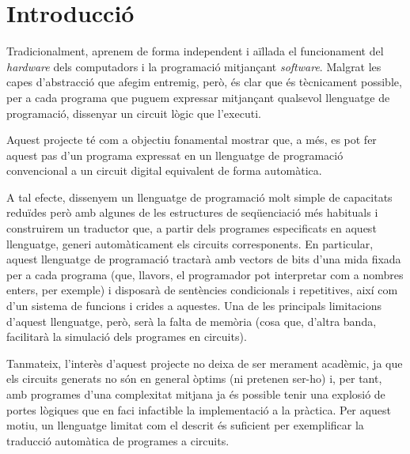 
\section{Introducció}

Tradicionalment, aprenem de forma independent i aïllada el funcionament del 
\textit{hardware} dels computadors i la programació mitjançant 
\textit{software}. Malgrat les capes d'abstracció que afegim entremig, però, 
és clar que és tècnicament possible, per a cada programa que puguem expressar 
mitjançant qualsevol llenguatge de programació, dissenyar un circuit lògic que 
l'executi.

Aquest projecte té com a objectiu fonamental mostrar que, a més, es pot fer 
aquest pas d'un programa expressat en un llenguatge de programació 
convencional a un circuit digital equivalent de forma automàtica. 

A tal efecte, dissenyem un llenguatge de programació molt simple de capacitats 
reduïdes però amb algunes de les estructures de seqüenciació més habituals i 
construirem un traductor que, a partir dels programes especificats en aquest 
llenguatge, generi automàticament els circuits corresponents. En particular, 
aquest llenguatge de programació tractarà amb vectors de bits d'una mida 
fixada per a cada programa (que, llavors, el programador pot interpretar com a 
nombres enters, per exemple) i disposarà de sentències condicionals i 
repetitives, així com d'un sistema de funcions i crides a aquestes. Una de 
les principals limitacions d'aquest llenguatge, però, serà la falta de memòria 
(cosa que, d'altra banda, facilitarà la simulació dels programes en circuits). 

Tanmateix, l'interès d'aquest projecte no deixa de ser merament acadèmic, ja 
que els circuits generats no són en general òptims (ni pretenen ser-ho) i, per 
tant, amb programes d'una complexitat mitjana ja és possible tenir una 
explosió de portes lògiques que en faci infactible la implementació a la 
pràctica. Per aquest motiu, un llenguatge limitat com el descrit és suficient 
per exemplificar la traducció automàtica de programes a circuits.

